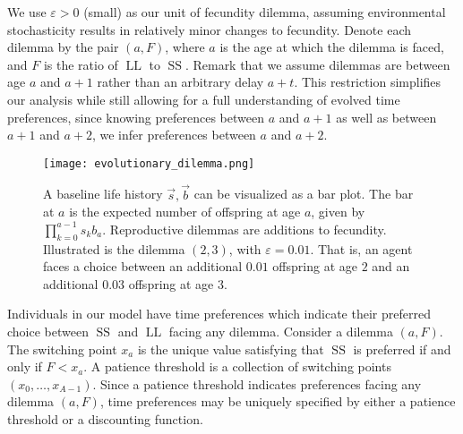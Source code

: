 \documentclass[titlepage, hidelinks, 12pt]{article}
\theoremstyle{plain}
\theoremstyle{remark}
\theoremstyle{definition}
\DeclareMathOperator{\smallersooner}{SS}
\DeclareMathOperator{\largerlater}{LL}
\begin{document}
We use $\varepsilon > 0$ (small) as our unit of fecundity dilemma, assuming environmental stochasticity results in relatively minor changes to 
fecundity. 
Denote each dilemma by the pair $(a, F)$, where $a$ is the age at which the dilemma is faced,
and $F$ is the ratio of $\largerlater$ to $\smallersooner$. 
Remark that we assume dilemmas are between age $a$ and $a+1$ rather than an arbitrary delay $a+t$. This restriction simplifies our analysis
while still allowing for a full understanding of evolved time preferences, since knowing preferences between $a$ and $a+1$ as well as between
$a+1$ and $a+2$, we infer preferences between $a$ and $a+2$. 

\begin{figure}[H]
    \centering
    \texttt{[image: evolutionary\_dilemma.png]}
    \caption[Baseline life history and reproductive dilemma example.]{A baseline life history $\vec{s}, \vec{b}$ can be visualized as a bar plot. The bar at $a$ is the expected number of offspring at
        age $a$, given by
    $\prod_{k = 0}^{a-1} s_k b_a$. Reproductive dilemmas are additions to fecundity. Illustrated is the dilemma $(2, 3)$, with
$\varepsilon = 0.01$. That is, an agent faces a choice between an additional $0.01$ offspring at age $2$ and an additional $0.03$ offspring
at age $3$.} 
\end{figure}

Individuals in our model have time preferences which indicate their preferred choice between $\smallersooner$ and $\largerlater$ facing any
dilemma. 
Consider a dilemma $(a, F)$. The switching point $x_a$ is the unique value satisfying that $\smallersooner$ is preferred
if and only if $F < x_a$. 
A patience threshold is a collection of switching points $(x_0, \ldots, x_{A-1})$.
Since a patience threshold indicates preferences facing any dilemma $(a, F)$, time preferences may be uniquely 
specified by either a patience threshold or a discounting function. 
\end{document}
